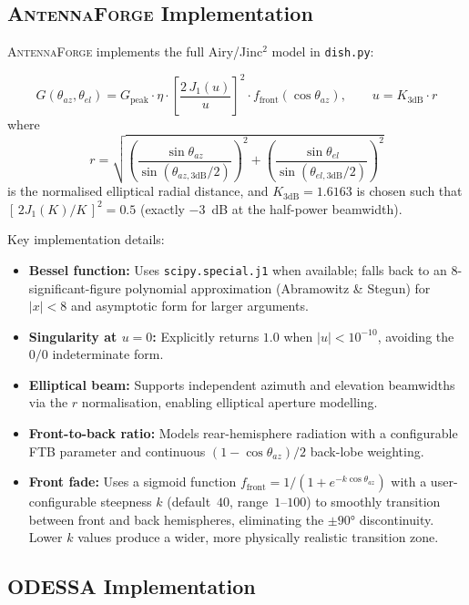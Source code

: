 \documentclass[11pt,a4paper]{article}
\newcommand{\AF}{\textsc{AntennaForge}}
\newcommand{\OD}{\textsc{ODESSA}}
\begin{document}
\subsection{\AF{} Implementation}

\AF{} implements the full Airy/Jinc$^2$ model in \texttt{dish.py}:

\begin{equation}
  G(\theta_{az}, \theta_{el}) = G_{\text{peak}} \cdot \eta \cdot
    \left[ \frac{2\,J_1(u)}{u} \right]^2 \cdot f_{\text{front}}(\cos\theta_{az}),
  \qquad
  u = K_{3\text{dB}} \cdot r
  \label{eq:af_dish}
\end{equation}
where
\[
  r = \sqrt{
    \left(\frac{\sin\theta_{az}}{\sin(\theta_{az,3\text{dB}}/2)}\right)^2 +
    \left(\frac{\sin\theta_{el}}{\sin(\theta_{el,3\text{dB}}/2)}\right)^2
  }
\]
is the normalised elliptical radial distance, and $K_{3\text{dB}} = 1.6163$ is
chosen such that $[\,2J_1(K)/K\,]^2 = 0.5$ (exactly $-3$~dB at the half-power
beamwidth).

Key implementation details:
\begin{itemize}[leftmargin=2em]
  \item \textbf{Bessel function:} Uses \texttt{scipy.special.j1} when available;
        falls back to an 8-significant-figure polynomial approximation
        (Abramowitz \& Stegun) for $|x| < 8$ and asymptotic form for larger
        arguments.
  \item \textbf{Singularity at $u = 0$:} Explicitly returns $1.0$ when
        $|u| < 10^{-10}$, avoiding the $0/0$ indeterminate form.
  \item \textbf{Elliptical beam:} Supports independent azimuth and elevation
        beamwidths via the $r$ normalisation, enabling elliptical aperture
        modelling.
  \item \textbf{Front-to-back ratio:} Models rear-hemisphere radiation with a
        configurable FTB parameter and continuous $(1 - \cos\theta_{az})/2$
        back-lobe weighting.
  \item \textbf{Front fade:} Uses a sigmoid function
        $f_{\text{front}} = 1/(1 + e^{-k\cos\theta_{az}})$ with a
        user-configurable steepness $k$ (default~$40$, range~$1$--$100$)
        to smoothly transition between front and back hemispheres, eliminating
        the $\pm 90°$ discontinuity.  Lower $k$ values produce a wider,
        more physically realistic transition zone.
\end{itemize}

\subsection{\OD{} Implementation}
\end{document}
